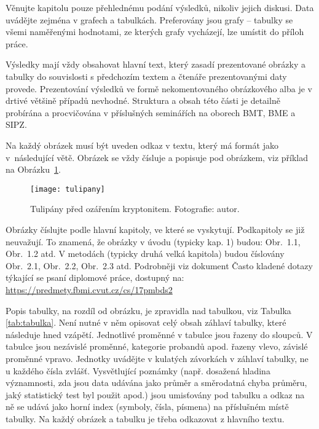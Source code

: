 Věnujte kapitolu pouze přehlednému podání výsledků, nikoliv jejich diskusi. 
Data uvádějte zejména v grafech a tabulkách. 
Preferovány jsou grafy – tabulky se všemi naměřenými hodnotami, ze kterých grafy vycházejí, lze umístit do příloh práce.

Výsledky mají vždy obsahovat hlavní text, který zasadí prezentované obrázky a tabulky do souvislosti s předchozím textem a čtenáře prezentovanými daty provede. 
Prezentování výsledků ve formě nekomentovaného obrázkového alba je v drtivé většině případů nevhodné.
Struktura a obsah této části je detailně probírána a procvičována v příslušných seminářích na oborech BMT, BME a SIPZ.

Na každý obrázek musí být uveden odkaz v textu, který má formát jako v~ná\-sle\-du\-jí\-cí větě. 
Obrázek se vždy čísluje a popisuje pod obrázkem, viz příklad na Obrázku~\ref{fig:tulipany}.

\begin{figure}[h]
	\begin{center}
		\texttt{[image: tulipany]}
		\caption{Tulipány před ozářením kryptonitem. Fotografie: autor.}
        \label{fig:tulipany}
	\end{center}
\end{figure}
 
 
Obrázky číslujte podle hlavní kapitoly, ve které se vyskytují. Podkapitoly se již neuvažují. 
To znamená, že obrázky v úvodu (typicky kap. 1) budou: Obr.~1.1, Obr.~1.2 atd. V metodách (typicky druhá velká kapitola) budou číslovány Obr.~2.1, Obr.~2.2, Obr.~2.3 atd. 
Podrobněji viz dokument Často kladené dotazy týkající se psaní diplomové práce, dostupný na:
\url{https://predmety.fbmi.cvut.cz/cs/17pmbds2}

Popis tabulky, na rozdíl od obrázku, je zpravidla nad tabulkou, viz Tabulka \ref{tab:tabulka}. 
Není nutné v něm opisovat celý obsah záhlaví tabulky, které následuje hned vzápětí. 
Jednotlivé proměnné v tabulce jsou řazeny do sloupců. 
V tabulce jsou nezávislé proměnné, kategorie probandů apod. řazeny vlevo, závislé proměnné vpravo. 
Jednotky uvádějte v kulatých závorkách v záhlaví tabulky, ne u každého čísla zvlášť. 
Vysvětlující poznámky (např. dosažená hladina významnosti, zda jsou data udávána jako průměr a směrodatná chyba průměru, jaký statistický test byl použit apod.) jsou umisťovány pod tabulku a odkaz na ně se udává jako horní index (symboly, čísla, písmena) na příslušném místě tabulky. 
Na každý obrázek a tabulku je třeba odkazovat z hlavního textu.

